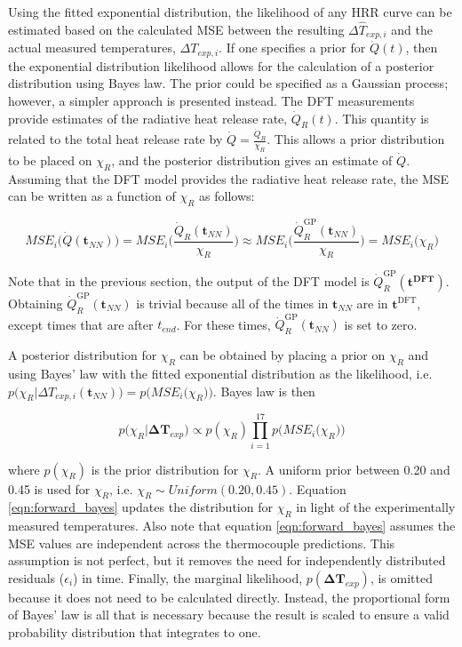 \documentclass{article}
\begin{document}
Using the fitted exponential distribution, the likelihood of any HRR curve can be estimated based on the calculated MSE between the resulting $\Delta \hat{T}_{exp, i}$ and the actual measured temperatures, $\Delta {T}_{exp, i}$. If one specifies a prior for $\dot{Q}(t)$, then the exponential distribution likelihood allows for the calculation of a posterior distribution using Bayes law. The prior could be specified as a Gaussian process; however, a simpler approach is presented instead. The DFT measurements provide estimates of the radiative heat release rate, $\dot{Q}_R(t)$. This quantity is related to the total heat release rate by $\dot{Q} = \frac{\dot{Q}_R}{\chi_R}$. This allows a prior distribution to be placed on $\chi_R$, and the posterior distribution gives an estimate of $\dot{Q}$. Assuming that the DFT model provides the radiative heat release rate, the MSE can be written as a function of $\chi_R$ as follows:

\begin{equation}
  \label{eqn:MSE_chi_R}
MSE_i\Big(\dot{Q}(\boldsymbol{t}_{NN}) \Big) = MSE_i\Big( \frac{\dot{Q}_R(\boldsymbol{t}_{NN})}{\chi_R}\Big) \approx MSE_i\Big( \frac{\dot{Q}^{\text{GP}}_R(\boldsymbol{t}_{NN})}{\chi_R}\Big) = MSE_i\Big( \chi_R\Big)
\end{equation}

\noindent Note that in the previous section, the output of the DFT model is $\dot{Q}_{R}^{\text{GP}}(\boldsymbol{t^{\text{DFT}}})$. Obtaining $\dot{Q}^{\text{GP}}_R(\boldsymbol{t}_{NN})$ is trivial because all of the times in $\boldsymbol{t}_{NN}$ are in $\boldsymbol{t}^{\text{DFT}}$, except times that are after $t_{end}$. For these times, $\dot{Q}^{\text{GP}}_R(\boldsymbol{t}_{NN})$ is set to zero. 

A posterior distribution for $\chi_R$ can be obtained by placing a prior on $\chi_R$ and using Bayes' law with the fitted exponential distribution as the likelihood, i.e. $p\big(\chi_R | \Delta T_{exp,i}(\boldsymbol{t}_{NN}) \big) = p\Big(MSE_i\big(\chi_R\big) \Big)$. Bayes law is then 

\begin{equation}
  \label{eqn:forward_bayes}
p\big(\chi_R | \boldsymbol{\Delta T}_{exp} \big) \propto p(\chi_R) \prod_{i=1}^{17} p\Big(MSE_i\big(\chi_R\big) \Big)
\end{equation}


\noindent where $p(\chi_R)$ is the prior distribution for $\chi_R$. A uniform prior between 0.20 and 0.45 is used for $\chi_R$, i.e. $\chi_R \sim Uniform(0.20, 0.45)$. Equation \ref{eqn:forward_bayes} updates the distribution for $\chi_R$ in light of the experimentally measured temperatures. Also note that equation \ref{eqn:forward_bayes} assumes the MSE values are independent across the thermocouple predictions. This assumption is not perfect, but it removes the need for independently distributed residuals ($\epsilon _i$) in time. Finally, the marginal likelihood, $p(\boldsymbol{\Delta T}_{exp})$, is omitted because it does not need to be calculated directly. Instead, the proportional form of Bayes' law is all that is necessary because the result is scaled to ensure a valid probability distribution that integrates to one. 
\end{document}
